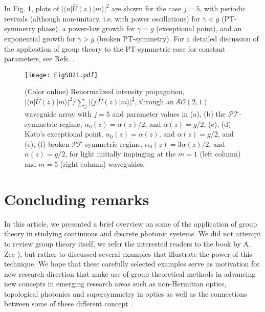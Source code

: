 \documentclass[12pt]{iopart}
\newcommand{\bra}[1]{ \langle #1|}
\newcommand{\ket}[1]{ |#1\rangle}
\begin{document}
In Fig. \ref{fig:SO21}, plots of $|\bra{n}\hat{U}(z)\ket{m}|^2$ are shown for the case $j=5$, with periodic revivals
 (although non-unitary, i.e. with power oscillations) for $\gamma<g$ (PT-symmetry phase), a power-law growth for $\gamma=g$
(exceptional point), and an exponential growth for $\gamma>g$ (broken PT-symmetry).
For a detailed discussion of the application of group theory to the PT-symmetric case for constant parameters, see Refs. \cite{OL,Symmetry}.


\begin{figure}
\center \texttt{[image: FigSO21.pdf]}
\caption{(Color online) Renormalized intensity propagation, $|\bra{n}\hat{U}(z)\ket{m}|^2 / \sum_{j}|\bra{j}\hat{U}(z)\ket{m}|^2$, through an $\mathcal{SO}(2,1)$ waveguide array with  $j=5$ and parameter values in
 (a), (b) the $\mathcal{PT}$-symmetric regime,  $\alpha_{0}(z) = \alpha(z)/2  $, and $\alpha(z) = g/2$, (c), (d) Kato's exceptional point,  $\alpha_{0}(z) = \alpha(z) $, and $\alpha(z) = g/2$, and (e), (f) broken $\mathcal{PT}$-symmetric regime, $\alpha_{0}(z) = 3 \alpha(z) / 2 $, and $\alpha(z) = g/2$, for light initially impinging at the $m=1$ (left column) and $m=5$ (right column) waveguides.}
\label{fig:SO21}
\end{figure}


\section{Concluding remarks}

In this article, we presented a brief overview on some of the application of group theory in studying continuous and discrete photonic systems. We did not attempt to review group theory itself, we refer the interested readers to the book by A. Zee \cite{Zee}), but rather to discussed several examples that illustrate the power of this technique. We hope that these carefully selected examples serve as motivation for new research direction that make use of group theoretical methods in advancing new concepts in emerging research areas such as non-Hermitian optics, topological photonics and supersymmetry in optics as well as the connections between some of these different concept \cite{Schomerus1,Topo_non_Hermitian,SUSY_non_Hermitian,SUSY_PT}.
\end{document}
